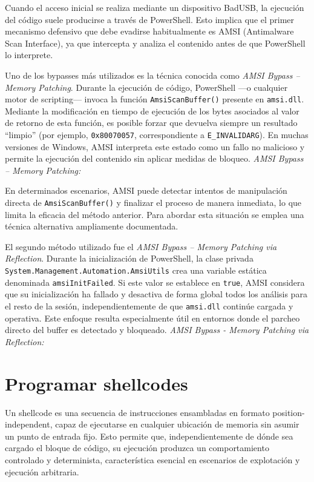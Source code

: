 Cuando el acceso inicial se realiza mediante un dispositivo BadUSB, la ejecución del código suele producirse a través de PowerShell. Esto implica que el primer mecanismo defensivo que debe evadirse habitualmente es AMSI (Antimalware Scan Interface), ya que intercepta y analiza el contenido antes de que PowerShell lo interprete.

Uno de los bypasses más utilizados es la técnica conocida como \textit{AMSI Bypass – Memory Patching}. Durante la ejecución de código, PowerShell —o cualquier motor de scripting— invoca la función \texttt{AmsiScanBuffer()} presente en \texttt{amsi.dll}. Mediante la modificación en tiempo de ejecución de los bytes asociados al valor de retorno de esta función, es posible forzar que devuelva siempre un resultado “limpio” (por ejemplo, \texttt{0x80070057}, correspondiente a \texttt{E\_INVALIDARG}). En muchas versiones de Windows, AMSI interpreta este estado como un fallo no malicioso y permite la ejecución del contenido sin aplicar medidas de bloqueo. \textit{AMSI Bypass – Memory Patching: \cite{amsi-bypass-patching}}

En determinados escenarios, AMSI puede detectar intentos de manipulación directa de \texttt{AmsiScanBuffer()} y finalizar el proceso de manera inmediata, lo que limita la eficacia del método anterior. Para abordar esta situación se emplea una técnica alternativa ampliamente documentada.

El segundo método utilizado fue el \textit{AMSI Bypass – Memory Patching via Reflection}. Durante la inicialización de PowerShell, la clase privada \\ \texttt{System.Management.Automation.AmsiUtils} crea una variable estática denominada \texttt{amsiInitFailed}. Si este valor se establece en \texttt{true}, AMSI considera que su inicialización ha fallado y desactiva de forma global todos los análisis para el resto de la sesión, independientemente de que \texttt{amsi.dll} continúe cargada y operativa. Este enfoque resulta especialmente útil en entornos donde el parcheo directo del buffer es detectado y bloqueado. \textit{AMSI Bypass - Memory Patching via Reflection: \cite{amsi-bypass-reflection}}


\section{Programar shellcodes}
\label{sec:shellcode}

Un shellcode es una secuencia de instrucciones ensambladas en formato position-independent, capaz de ejecutarse en cualquier ubicación de memoria sin asumir un punto de entrada fijo. Esto permite que, independientemente de dónde sea cargado el bloque de código, su ejecución produzca un comportamiento controlado y determinista, característica esencial en escenarios de explotación y ejecución arbitraria.

